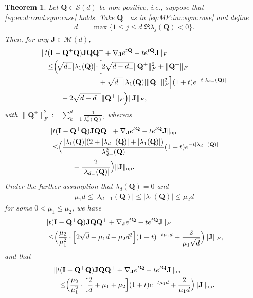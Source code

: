 \documentclass[9pt,twocolumn,twoside]{pnas-new}
\newcommand{\?}{\textbf{?}}
\newcommand{\op}{\textnormal{op}}
\newcommand{\QQ}{\mathbf{Q}}
\newcommand{\JJ}{\mathbf{J}}
\newcommand{\II}{\mathbf{I}}
\newtheorem{theorem}{\bf Theorem}
\begin{document}
\begin{theorem}\label{thm:bride:of:frankinstein}
  Let $\QQ \in \mathcal{S}(d)$ be non-positive, i.e.,  suppose that
  \eqref{eq:ev:d:cond:sym:case} holds.  Take $\QQ^+$ as in
  \eqref{eq:MP:inv:sym:case} and define
    \begin{align}\label{eq:first:neg}
      d_{-} = \max\{ 1 \leq j \leq d | \Re \lambda_{j}(\QQ) < 0\}.
    \end{align}
    Then, for any $\JJ \in \mathcal{M}(d)$,
  \begin{align}
      \| t(\II&  -\QQ^+  \QQ) \JJ \QQ \QQ^{+}
                +  \nabla_\JJ e^{t \QQ} - t  e^{t\QQ} \JJ\|_{F} 
                \label{eq:bride:of:frankinstein:1}\\
    \leq&  
    \Big( \! \sqrt{d_{-}}|\lambda_1(\QQ)| \! \cdot\!  \Big[ 2 \sqrt{d-d_{-}} \| \QQ^+\|_F^2 +  \| \QQ^+\|_F
    \notag \\ 
              &\qquad \qquad \qquad \;
    + \sqrt{d_{-}}|\lambda_1(\QQ)|\| \QQ^+\|_F^2 \Big]   (1+t)e^{- t|\lambda_{d-}(\QQ)|}
   \notag \\ 
&\quad+  2\sqrt{d - d_{-}} \| \QQ^+\|_F  \Big)\|\JJ\|_{F},  \notag
  \end{align}
  with $\| \QQ^+\|_F^2 := \sum^{d_-}_{k=1}\frac{1}{\lambda^2_{k}(\QQ)}$, whereas
  \begin{align}
    \| t(&\II -\QQ^+ \QQ) \JJ \QQ \QQ^{+}
         +  \nabla_\JJ e^{t \QQ} - t  e^{t\QQ} \JJ\|_{\op}
         \label{eq:bride:of:frankinstein}\\
    \leq &
           \Big(
           \frac{|\lambda_1(\QQ)|(2 + |\lambda_{d_-}(\QQ)|  + |\lambda_1(\QQ)|)}{\lambda^2_{d-}(\QQ)} 
           (1+t) e^{-t |\lambda_{d_-}(\QQ)|}
           \notag
    \\ 
              &\qquad+ \frac{2}{|\lambda_{d_{-}}(\QQ)|}\Big) \|\JJ\|_{\op}.
                \notag
  \end{align}
  Under the further assumption that $\lambda_{d}(\QQ) = 0$
  and
  \begin{align}
    \mu_1 d \leq |\lambda_{d-1}(\QQ)|
    \leq |\lambda_{1}(\QQ)| \leq \mu_2 d
  \end{align}
  for some $0< \mu_1\leq \mu_2$, we have
    \begin{align}\label{eq:bride:of:frankinstein:1:rm:app}
    \| t(&\II  -\QQ^+ \QQ) \JJ \QQ \QQ^{+}
         +  \nabla_\JJ e^{t \QQ} - t  e^{t\QQ} \JJ\|_{F}
         \\
     \leq &    \Big(\frac{\mu_2}{\mu_1^2}  \cdot \Big[ 2 \sqrt{d} + \mu_1 d  
            +  \mu_2 d^2\Big](1+t)^{-t \mu_1 d} +  \frac{2}{\mu_1 \sqrt{d}} \Big) \|\JJ\|_{F},
            \notag
  \end{align}
  and that
    \begin{align}\label{eq:bride:of:frankinstein:0:rm:app}
    \| t(\II & -\QQ^+ \QQ) \JJ \QQ \QQ^{+}
         +  \nabla_\JJ e^{t \QQ} - t  e^{t\QQ} \JJ\|_{\op}\\
      \leq &  \Big( \frac{\mu_2}{\mu^2_1}\cdot\Big[   \frac{2}{d} + \mu_1  +\mu_2\Big]
             (1+t)e^{-t \mu_1 d} + \frac{2}{\mu_1 d}\Big)
            \|\JJ\|_{\op}.\notag
  \end{align}
\end{theorem}
\end{document}
